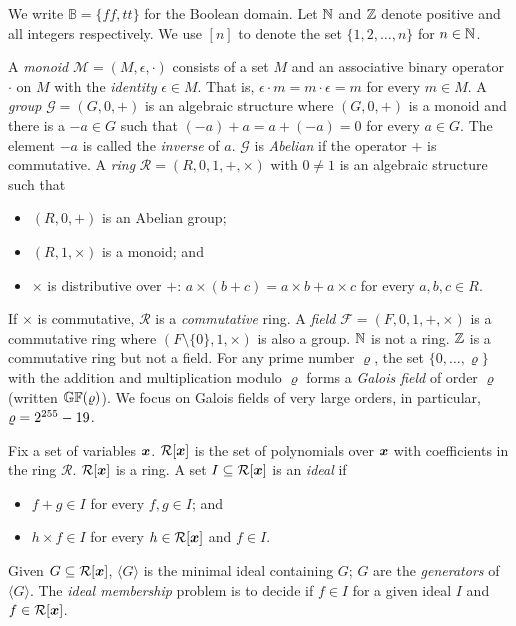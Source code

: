 
We write $\mathbb{B} = \{ \mathit{ff}, \mathit{tt} \}$ for the Boolean
domain. Let $\mathbb{N}$ and $\mathbb{Z}$ denote positive and all integers
respectively. We use $[n]$ to denote the set $\{ 1, 2, \ldots, n \}$
for $n \in \mathbb{N}$. 

A \emph{monoid} $\mathcal{M} = (M, \epsilon, \cdot)$ consists of a set
$M$ and an associative binary operator $\cdot$ on $M$ with the
\emph{identity} $\epsilon \in M$. That is, $\epsilon \cdot m = m \cdot
\epsilon = m$ for every $m \in M$.
A \emph{group} $\mathcal{G} = (G, 0, +)$ is an algebraic structure
where $(G, 0, +)$ is a monoid and there is a $-a \in G$ such that
$(-a) + a = a + (-a) = 0$ for every $a \in G$. The element $-a$ is
called the \emph{inverse} of $a$. $\mathcal{G}$ is \emph{Abelian} if
the operator $+$ is commutative.
A \emph{ring} $\mathcal{R} = (R, 0, 1, +, \times)$ with $0 \neq 1$ is
an algebraic structure such that
\begin{itemize}
\item $(R, 0, +)$ is an Abelian group; 
\item $(R, 1, \times)$ is a monoid; and 
\item $\times$ is distributive over $+$: $a \times (b + c) = a \times
  b + a \times c$ for every $a, b, c \in R$.
\end{itemize}
If $\times$ is commutative, $\mathcal{R}$ is a \emph{commutative}
ring. 
A \emph{field} $\mathcal{F} = (F,
0, 1, +, \times)$ is a commutative ring where $(F\!\setminus\!\{0\}, 1, \times)$ is also
a group. $\mathbb{N}$ is not a ring. $\mathbb{Z}$ is a commutative ring but not
a field. 
For any prime number $\varrho$, the set $\{ 0, \ldots, \varrho \}$
with the addition and multiplication modulo $\varrho$ forms a \emph{Galois
field} of order $\varrho$ (written $\mathbb{GF}(\varrho)$).
We focus on Galois fields of very large orders, in particular, $\varrho =
2^{255} - 19$.

Fix a set of variables $\vx$. $\mathcal{R}[\vx]$ is the set of
polynomials over $\vx$ with coefficients in the ring
$\mathcal{R}$. $\mathcal{R}[\vx]$ is a ring. A set $I \subseteq
\mathcal{R}[\vx]$ is an \emph{ideal} if 
\begin{itemize}
\item $f + g \in I$ for every $f, g \in I$; and
\item $h \times f \in I$ for every $h \in
  \mathcal{R}[\vx]$ and $f \in I$. 
\end{itemize}
Given $G \subseteq \mathcal{R}[\vx]$, $\langle G \rangle$ is the
minimal ideal containing $G$; $G$ are the \emph{generators}
of $\langle G \rangle$. The \emph{ideal membership}
problem is to decide if $f \in I$ for a given ideal $I$ and $f
\in \mathcal{R}[\vx]$.

